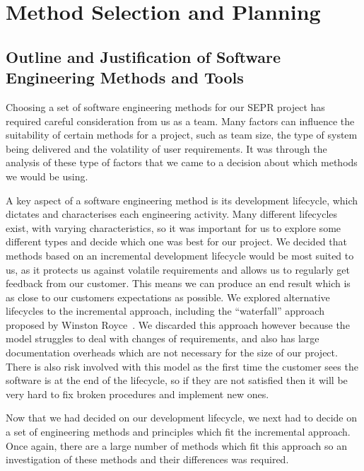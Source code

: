 \chapter{Method Selection and Planning}
\section{Outline and Justification of Software Engineering Methods and Tools}

Choosing a set of software engineering methods for our SEPR project has required careful consideration from us as a team.
Many factors can influence the suitability of certain methods for a project, such as team size, the type of system being delivered and the volatility of user requirements.
It was through the analysis of these type of factors that we came to a decision about which methods we would be using.

A key aspect of a software engineering method is its development lifecycle, which dictates and characterises each engineering activity.
Many different lifecycles exist, with varying characteristics, so it was important for us to explore some different types and decide which one was best for our project.
We decided that methods based on an incremental development lifecycle would be most suited to us, as it protects us against volatile requirements and allows us to regularly get feedback from our customer.
This means we can produce an end result which is as close to our customers expectations as possible. We explored alternative lifecycles to the incremental approach, including the “waterfall” approach proposed by Winston Royce~\cite{royce1970managing}.
We discarded this approach however because the model struggles to deal with changes of requirements, and also has large documentation overheads which are not necessary for the size of our project.
There is also risk involved with this model as the first time the customer sees the software is at the end of the lifecycle, so if they are not satisfied then it will be very hard to fix broken procedures and implement new ones.

Now that we had decided on our development lifecycle, we next had to decide on a set of engineering methods and principles which fit the incremental approach.
Once again, there are a large number of methods which fit this approach so an investigation of these methods and their differences was required.

